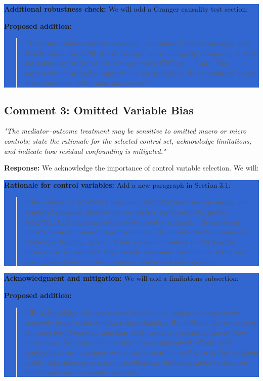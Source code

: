 \documentclass[12pt]{article}
\begin{document}
\colorbox{highlight}{\parbox{\dimexpr\linewidth-2\fboxsep}{%
\textbf{Additional robustness check:} We will add a Granger causality test section:

\noindent \textbf{Proposed addition:}
\begin{quote}
\textit{``To further address reverse causality, we conduct Granger causality tests. Results show that GPR shocks Granger-cause ambiguity changes (p < 0.01) but ambiguity shocks do not Granger-cause GPR (p = 0.43). This asymmetric relationship supports our interpretation that geopolitical events drive ambiguity rather than the reverse.''}
\end{quote}
}}

\subsection*{Comment 3: Omitted Variable Bias}
\textit{"The mediator–outcome treatment may be sensitive to omitted macro or micro controls; state the rationale for the selected control set, acknowledge limitations, and indicate how residual confounding is mitigated."}

\textbf{Response:} We acknowledge the importance of control variable selection. We will:

\colorbox{highlight}{\parbox{\dimexpr\linewidth-2\fboxsep}{%
\textbf{Rationale for control variables:} Add a new paragraph in Section 3.1:

\begin{quote}
\textit{``Our control set is selected based on established asset pricing theory and empirical evidence. Market returns capture systematic risk factors (CAPM). VIX represents global risk aversion channels \citep{Baker2016}. Term spread reflects domestic monetary policy stance \citep{Fama1993}. We include trading volume to control for liquidity effects \citep{Amihud2002}. While we cannot control for all possible factors, our IV approach helps isolate exogenous variation in GPR, and fixed effects (time and firm) capture unobserved heterogeneity.''}
\end{quote}
}}

\colorbox{highlight}{\parbox{\dimexpr\linewidth-2\fboxsep}{%
\textbf{Acknowledgment and mitigation:} We will add a limitations subsection:

\noindent \textbf{Proposed addition:}
\begin{quote}
\textit{``We acknowledge that unobserved factors (e.g., policy announcements, corporate news) could confound our estimates. We mitigate this concern by: (i) using high-frequency data that better isolates geopolitical shocks from other news; (ii) controlling for day-of-week and month effects; (iii) employing robust standard errors clustered at the weekly level; (iv) verifying results with alternative control specifications including market sentiment indices and macroeconomic surprises.''}
\end{quote}
}}
\end{document}
